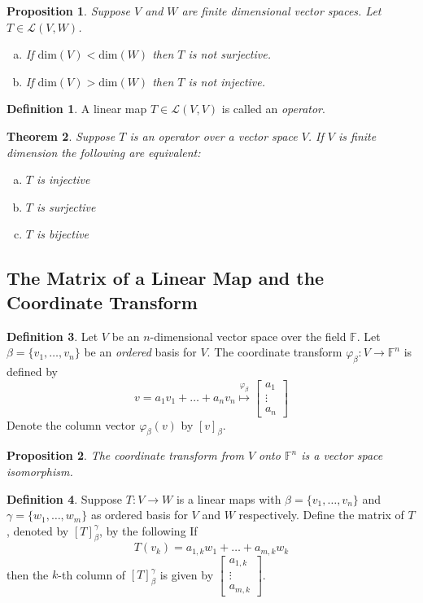 \documentclass[12pt,letterpaper]{article}
\theoremstyle{plain}
\newtheorem{theorem}{Theorem}[section]
\newtheorem{proposition}{Proposition}[section]
\theoremstyle{definition}
\newtheorem{definition}[theorem]{Definition}
\numberwithin{equation}{section}
\begin{document}
\begin{proposition} Suppose $V$ and $W$ are finite dimensional vector spaces. Let $T\in \mathcal{L}(V,W)$. 
\begin{enumerate}[a)]
\item If $\text{dim}(V)<\text{dim}(W)$ then $T$ is not surjective.
\item If $\text{dim}(V)>\text{dim}(W)$ then $T$ is not injective.
\end{enumerate}
\end{proposition}

\begin{definition} A linear map $T\in \mathcal{L}(V,V)$ is called an \emph{operator}. 
\end{definition}
\begin{theorem} Suppose $T$ is an operator over a vector space $V$. If $V$ is finite dimension the following are equivalent:
\begin{enumerate}[a)]
\item $T$ is injective
\item $T$ is surjective
\item $T$ is bijective
\end{enumerate}
\end{theorem}

\subsection{The Matrix of a Linear Map and the Coordinate Transform}
\begin{definition} Let $V$ be an $n$-dimensional vector space over the field $\mathbb{F}$. Let $\beta=\{v_1, \ldots, v_n\}$ be an \emph{ordered} basis for $V$. The coordinate transform $\varphi_\beta:V\rightarrow \mathbb{F}^n$ is defined by 
\[v=a_1v_1+\ldots+a_nv_n\overset{\varphi_\beta}{\longmapsto} \begin{bmatrix}a_1\\ \vdots \\ a_n\end{bmatrix}\]
Denote the column vector $\varphi_\beta(v)$ by $[v]_\beta$.
\end{definition}
\begin{proposition} The coordinate transform from $V$ onto $\mathbb{F}^n$ is a vector space isomorphism.
\end{proposition}

\begin{definition} Suppose $T:V\rightarrow W$ is a linear maps with $\beta=\{v_1,\ldots, v_n\}$ and $\gamma=\{w_1, \ldots, w_m\}$ as ordered basis for $V$ and $W$ respectively. Define the matrix of $T$, denoted by $[T]_\beta^\gamma$, by the following
If 
\[T(v_k)=a_{1,k}w_1+\ldots +a_{m,k}w_k\]
then the $k$-th column of $[T]_\beta^\gamma$ is given by $\begin{bmatrix} a_{1,k}\\ \vdots \\ a_{m,k}\end{bmatrix}$. 
\end{definition}
\end{document}

